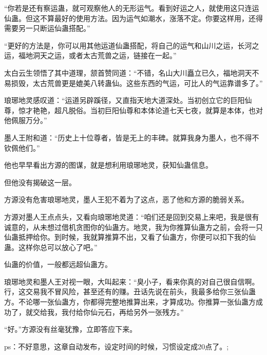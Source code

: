 \begin{this_body}
“你若是还有察运蛊，就可观察他人的无形运气。看到好运之人，就使用这只连运仙蛊。但这不算最好的使用方法。因为运气如潮水，涨落不定。你要这样用，还得需要另一只断运仙蛊搭配。”

“更好的方法是，你可以用其他运道仙蛊搭配，将自己的运气和山川之运，长河之运，福地洞天之运，或者太古荒兽之运，链接在一起。”

太白云生领悟了其中道理，颔首赞同道：“不错，名山大川矗立已久，福地洞天不易损毁，太古荒兽更是媲美八转蛊仙。这些东西的气运，可比人的气运靠谱多了。”

琅琊地灵感叹道：“运道另辟蹊径，又直指天地大道深处。当初创立它的巨阳仙尊，惊才艳艳，超凡脱俗。当初巨阳仙尊和本体论道七天七夜，就算是本体，也对他佩服万分。”

墨人王附和道：“历史上十位尊者，皆是无上的丰碑。就算我身为墨人，也不得不钦佩他们。”

他也早早看出方源的图谋，就是想利用琅琊地灵，获知仙蛊信息。

但他没有揭破这一层。

方源没有危害琅琊地灵，墨人王犯不着为了这点，恶了他和方源的脆弱关系。

方源对墨人王点点头，又看向琅琊地灵道：“咱们还是回到交易上来吧，我是很有诚意的，从未想过借机贪图你的仙蛊方。地灵，我为你推算仙蛊方之前，会将一只仙蛊抵押给你。到时候，我就算推算不出，又看了仙蛊方，你便可以扣下我的仙蛊。这样你总可以放心了吧。”

仙蛊的价值，一般都远超仙蛊方。

琅琊地灵和墨人王对视一眼，大叫起来：“臭小子，看来你真的对自己很自信啊。行，这交易我不冒风险，甚至还有的赚。丑话先说在前头，我最多给你三张仙蛊方。不论哪一张仙蛊方，你都得完整地推算出来，才算成功。你推算一张仙蛊方成功了，就交给我，我付给你仙元石，再给另外一张残方。”

“好。”方源没有丝毫犹豫，立即答应下来。

ps：不好意思，这章自动发布，设定时间的时候，习惯设定成20点了。;

\end{this_body}

